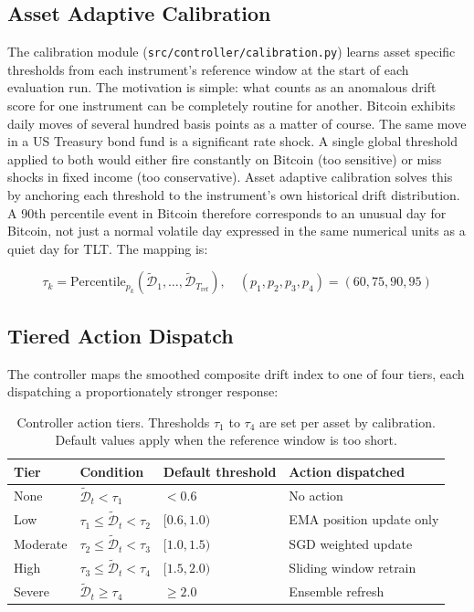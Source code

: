 \subsection{Asset Adaptive Calibration}
\label{subsec:calibration}

The calibration module (\texttt{src/controller/calibration.py}) learns asset specific thresholds from each instrument's reference window at the start of each evaluation run. The motivation is simple: what counts as an anomalous drift score for one instrument can be completely routine for another. Bitcoin exhibits daily moves of several hundred basis points as a matter of course. The same move in a US Treasury bond fund is a significant rate shock. A single global threshold applied to both would either fire constantly on Bitcoin (too sensitive) or miss shocks in fixed income (too conservative). Asset adaptive calibration solves this by anchoring each threshold to the instrument's own historical drift distribution. A 90th percentile event in Bitcoin therefore corresponds to an unusual day for Bitcoin, not just a normal volatile day expressed in the same numerical units as a quiet day for TLT. The mapping is:

\begin{equation}
  \tau_k = \text{Percentile}_{p_k}\!\left(\tilde{\mathcal{D}}_{1}, \ldots,
    \tilde{\mathcal{D}}_{T_{\text{ref}}}\right), \quad
  (p_1, p_2, p_3, p_4) = (60, 75, 90, 95)
  \label{eq:calibration}
\end{equation}

\subsection{Tiered Action Dispatch}
\label{subsec:tiered_actions}

The controller maps the smoothed composite drift index to one of four tiers, each dispatching a proportionately stronger response:

\begin{table}[htbp]
  \centering
  \caption{Controller action tiers. Thresholds $\tau_1$ to $\tau_4$ are set per asset
    by calibration. Default values apply when the reference window is too short.}
  \label{tab:controller_tiers}
  \begin{tabular}{llll}
    \hline
    \textbf{Tier} & \textbf{Condition} & \textbf{Default threshold}
      & \textbf{Action dispatched} \\
    \hline
    None     & $\tilde{\mathcal{D}}_t < \tau_1$ & $< 0.6$  & No action \\
    Low      & $\tau_1 \leq \tilde{\mathcal{D}}_t < \tau_2$ & $[0.6, 1.0)$ & EMA position update only \\
    Moderate & $\tau_2 \leq \tilde{\mathcal{D}}_t < \tau_3$ & $[1.0, 1.5)$ & SGD weighted update \\
    High     & $\tau_3 \leq \tilde{\mathcal{D}}_t < \tau_4$ & $[1.5, 2.0)$ & Sliding window retrain \\
    Severe   & $\tilde{\mathcal{D}}_t \geq \tau_4$          & $\geq 2.0$   & Ensemble refresh \\
    \hline
  \end{tabular}
\end{table}

